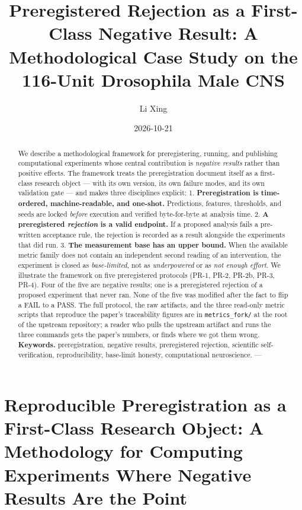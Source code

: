 \documentclass[
]{article}
\title{Preregistered Rejection as a First-Class Negative Result: A
Methodological Case Study on the 116-Unit Drosophila Male CNS}
\author{Li Xing}
\date{2026-10-21}
\begin{document}
\maketitle
\begin{abstract}
We describe a methodological framework for preregistering, running, and
publishing computational experiments whose central contribution is
\emph{negative results} rather than positive effects. The framework
treats the preregistration document itself as a first-class research
object --- with its own version, its own failure modes, and its own
validation gate --- and makes three disciplines explicit: 1.
\textbf{Preregistration is time-ordered, machine-readable, and
one-shot.} Predictions, features, thresholds, and seeds are locked
\emph{before} execution and verified byte-for-byte at analysis time. 2.
\textbf{A preregistered \emph{rejection} is a valid endpoint.} If a
proposed analysis fails a pre-written acceptance rule, the rejection is
recorded as a result alongside the experiments that did run. 3.
\textbf{The measurement base has an upper bound.} When the available
metric family does not contain an independent second reading of an
intervention, the experiment is closed as \emph{base-limited}, not as
\emph{underpowered} or as \emph{not enough effort}. We illustrate the
framework on five preregistered protocols (PR-1, PR-2, PR-2b, PR-3,
PR-4). Four of the five are negative results; one is a preregistered
rejection of a proposed experiment that never ran. None of the five was
modified after the fact to flip a FAIL to a PASS. The full protocol, the
raw artifacts, and the three read-only metric scripts that reproduce the
paper's traceability figures are in \texttt{metrics\_fork/} at the root
of the upstream repository; a reader who pulls the upstream artifact and
runs the three commands gets the paper's numbers, or finds where we got
them wrong. \textbf{Keywords.} preregistration, negative results,
preregistered rejection, scientific self-verification, reproducibility,
base-limit honesty, computational neuroscience. ---
\end{abstract}

{
\setcounter{tocdepth}{3}
\tableofcontents
}
\section{Reproducible Preregistration as a First-Class Research Object:
A Methodology for Computing Experiments Where Negative Results Are the
Point}\label{reproducible-preregistration-as-a-first-class-research-object-a-methodology-for-computing-experiments-where-negative-results-are-the-point}
\end{document}
